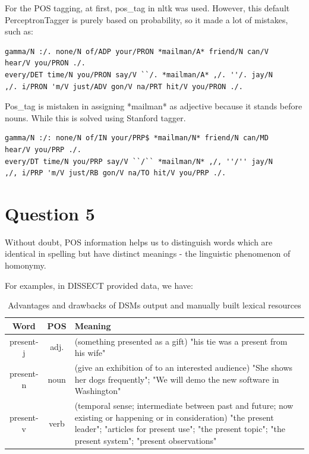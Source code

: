 \documentclass[12pt]{article}
\begin{document}
For the POS tagging, at first, pos\_tag in nltk was used. However, this default PerceptronTagger is purely based on probability, so it made a lot of mistakes, such as:
\begin{verbatim}
gamma/N :/. none/N of/ADP your/PRON *mailman/A* friend/N can/V
hear/V you/PRON ./.
every/DET time/N you/PRON say/V ``/. *mailman/A* ,/. ''/. jay/N
,/. i/PRON 'm/V just/ADV gon/V na/PRT hit/V you/PRON ./.
\end{verbatim}
Pos\_tag is mistaken in assigning *mailman* as adjective because it stands before nouns. While this is solved using Stanford tagger.
\begin{verbatim}
gamma/N :/: none/N of/IN your/PRP$ *mailman/N* friend/N can/MD
hear/V you/PRP ./.
every/DT time/N you/PRP say/V ``/`` *mailman/N* ,/, ''/'' jay/N
,/, i/PRP 'm/V just/RB gon/V na/TO hit/V you/PRP ./.
\end{verbatim}

\section{Question 5}
Without doubt, POS information helps us to distinguish words which are identical in spelling but have distinct meanings - the linguistic phenomenon of homonymy.

For examples, in DISSECT provided data, we have:

\begin{table}[H]
	\begin{tabular}{ | c | c | p{10cm} | }
		\hline
		Word & POS & Meaning\footnotemark \\
		\hline
		present-j & adj. & (something presented as a gift) "his tie was a present from his wife"  \\
		\hline
		present-n & noun & (give an exhibition of to an interested audience) "She shows her dogs frequently"; "We will demo the new software in Washington" \\
		\hline
		present-v & verb & (temporal sense; intermediate between past and future; now existing or happening or in consideration) "the present leader"; "articles for present use"; "the present topic"; "the present system"; "present observations" \\	
		\hline
	\end{tabular}
\caption{Advantages and drawbacks of DSMs output and manually built lexical resources}
\label{table:2}
\end{table}
\end{document}
